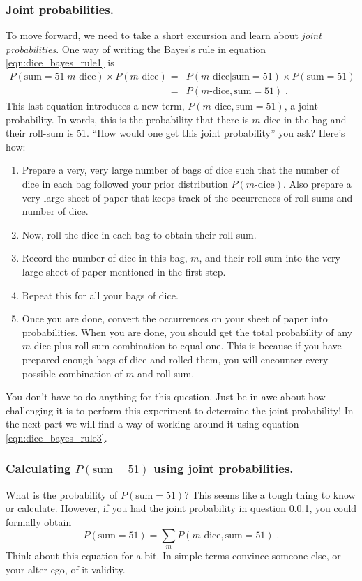 \documentclass[11pt, oneside]{article}   	%
\begin{document}
\subsubsection{Joint probabilities.}\label{sssec:dice_joint_probabilities}
To move forward, we need to take a short excursion and learn about {\it joint probabilities}. One way of writing the Bayes's rule in equation \eqref{eqn:dice_bayes_rule1} is 
\begin{eqnarray}
P(\text{sum}=51| m\text{-dice})  \times P(m\text{-dice}) &=& P(m \text{-dice}| \text{sum}=51)  \times P(\text{sum}=51) \nonumber \\
&=& P(m \text{-dice}, \text{sum}=51)\;. \label{eqn:dice_bayes_rule3}
\end{eqnarray}
This last equation introduces a new term, $P(m \text{-dice}, \text{sum}=51)$, a joint probability. In words, this is the probability that there is $m$-dice in the bag and their roll-sum is 51. ``How would one get this joint probability'' you ask? Here's how:
\begin{enumerate}
\item{} Prepare a very, very large number of bags of dice such that the number of dice in each bag followed your prior distribution $P(m\text{-dice})$. Also prepare a very large sheet of paper that keeps track of the occurrences of roll-sums and number of dice. 
\item{} Now, roll the dice in each bag to obtain their roll-sum. 
\item{} Record the number of dice in this bag, $m$, and their roll-sum into the very large sheet of paper mentioned in the first step.
\item{} Repeat this for all your bags of dice.
\item{} Once you are done, convert the occurrences on your sheet of paper into probabilities. When you are done, you should get the total probability of any $m$-dice plus roll-sum combination to equal one. This is because if you have prepared enough bags of dice and rolled them, you will encounter every possible combination of $m$ and roll-sum.\end{enumerate}
You don't have to do anything for this question. Just be in awe about how challenging it is to perform this experiment to determine the joint probability! In the next part we will find a way of working around it using equation \eqref{eqn:dice_bayes_rule3}. 

\subsubsection{Calculating $P(\text{sum}=51)$ using joint probabilities.}
What is the probability of $P(\text{sum}=51)$? This seems like a tough thing to know or calculate. However, if you had the joint probability in question \ref{sssec:dice_joint_probabilities}, you could formally obtain 
\begin{equation}
P(\text{sum}=51) = \sum_m P(m \text{-dice}, \text{sum}=51) \;. \label{eqn:dice_Psum}
\end{equation}
Think about this equation for a bit. In simple terms convince someone else, or your alter ego, of it validity.
\end{document}
